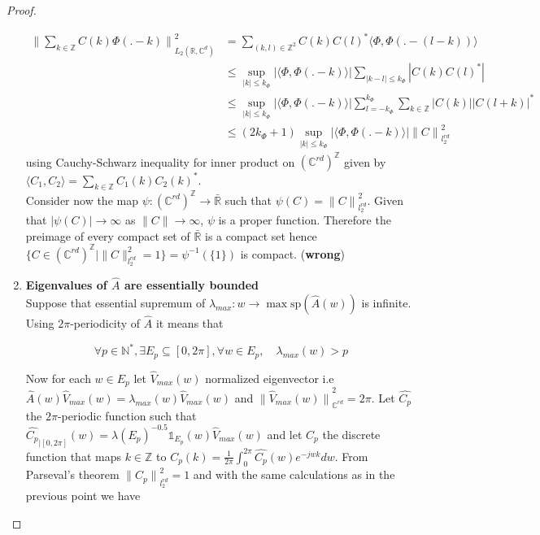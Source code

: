 \documentclass[a4paper, 11pt]{article}
\begin{document}
\begin{proof}
\begin{enumerate}
      \begin{align*}
        {\| \sum_{k \in \mathbb{Z}} C(k) \Phi(.-k)\|}_{L_2(\mathbb{R}, \mathbb{C}^{d})}^2 &= \sum_{(k, l) \in 
        \mathbb{Z}^2} C(k) {C(l)}^* \langle \Phi, \Phi(.-(l-k)) \rangle \\
        & \leq \sup_{|k| \leq k_{\Phi}} |\langle \Phi, \Phi(.-k) \rangle| \sum_{|k-l| \leq k_{\Phi}} |C(k) {C(l)}^*| \\
        & \leq \sup_{|k| \leq k_{\Phi}} |\langle \Phi, \Phi(.-k) \rangle| \sum_{l = -k_{\Phi}}^{k_{\Phi}} \sum_{k \in 
        \mathbb{Z}} |C(k)| |C(l+k)|^* \\
        & \leq (2k_{\Phi} + 1) \sup_{|k| \leq k_{\Phi}} |\langle \Phi, \Phi(.-k) \rangle| {\| C \|}^2_{l_2^{rd}}
    \end{align*}
    using Cauchy-Schwarz inequality for inner product on ${(\mathbb{C}^{rd})}^{\mathbb{Z}}$ given by $\displaystyle 
    \langle C_1, C_2 \rangle = \sum_{k \in \mathbb{Z}} C_1(k) {C_2(k)}^*$. \\

    Consider now the map $\psi: {(\mathbb{C}^{rd})}^{\mathbb{Z}} \to \bar{\mathbb{R}}$ such that $\psi(C) = 
    {\|C\|}^2_{l_2^{rd}}$. Given that $|\psi(C)| \to \infty$ as $\|C\| \to \infty$, $\psi$ is a proper function.  
    Therefore the preimage of every compact set of $\bar{\mathbb{R}}$ is a compact set hence $\{C \in 
    {(\mathbb{C}^{rd})}^{\mathbb{Z}} | \|C\|^2_{l_2^{rd}} = 1 \} = \psi^{-1}(\{1\})$ is compact. (\textbf{wrong})

    \item{\textbf{Eigenvalues of $\hat{A}$ are essentially bounded}}\\

      Suppose that essential supremum of $\lambda_{max}: w \to \max \text{sp} (\hat{A}(w))$ is infinite. Using 
      $2\pi$-periodicity of $\hat{A}$ it means that

      \begin{equation*}
      \forall p \in \mathbb{N}^*, \exists E_p \subseteq [0, 2\pi], \forall w \in E_p, \quad \lambda_{max}(w) > p
      \end{equation*}

      Now for each $w \in E_p$ let $\hat{V}_{max}(w)$ normalized eigenvector i.e $\hat{A}(w) \hat{V}_{max}(w) = 
      \lambda_{max}(w) \hat{V}_{max}(w)$ and ${\| \hat{V}_{max}(w) \|}^2_{\mathbb{C}^{rd}}=2\pi$. Let $\hat{C_p}$ the 
      $2\pi$-periodic function such that $\hat{C_p}_{|[0, 2\pi]}(w)=\lambda(E_p)^{-0.5} \mathds{1}_{E_p}(w) 
      \hat{V}_{max}(w)$ and let $C_p$ the discrete function that maps $k \in \mathbb{Z}$ to $C_p(k) = \frac{1}{2\pi} 
      \int_{0}^{2\pi} \hat{C_p}(w) e^{-jwk}dw$. From Parseval's theorem ${\|C_p\|}^2_{l_2^{rd}} = 1$ and with the same 
      calculations as in the previous point we have


\end{enumerate}
\end{proof}
\end{document}
